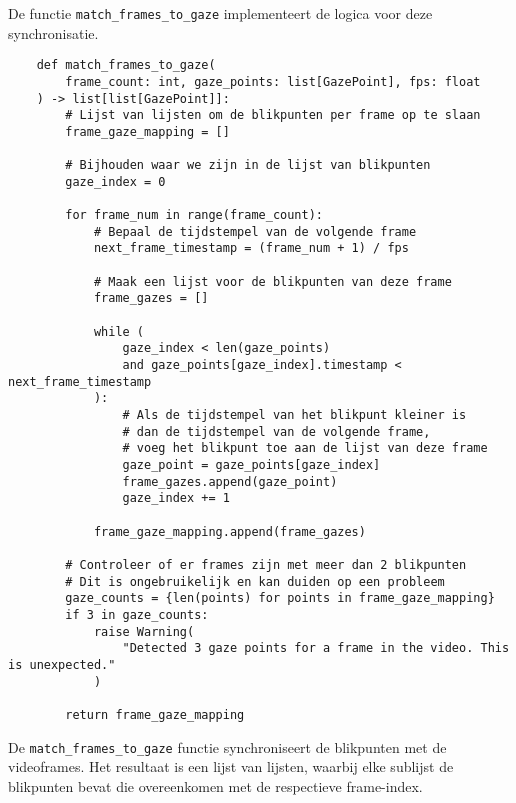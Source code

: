 De functie \texttt{match\_frames\_to\_gaze} implementeert de logica voor deze synchronisatie.
\begin{listing}
  \begin{verbatim}
    def match_frames_to_gaze(
        frame_count: int, gaze_points: list[GazePoint], fps: float
    ) -> list[list[GazePoint]]:
        # Lijst van lijsten om de blikpunten per frame op te slaan
        frame_gaze_mapping = []
        
        # Bijhouden waar we zijn in de lijst van blikpunten
        gaze_index = 0

        for frame_num in range(frame_count):
            # Bepaal de tijdstempel van de volgende frame
            next_frame_timestamp = (frame_num + 1) / fps

            # Maak een lijst voor de blikpunten van deze frame
            frame_gazes = []

            while (
                gaze_index < len(gaze_points)
                and gaze_points[gaze_index].timestamp < next_frame_timestamp
            ):
                # Als de tijdstempel van het blikpunt kleiner is 
                # dan de tijdstempel van de volgende frame,
                # voeg het blikpunt toe aan de lijst van deze frame
                gaze_point = gaze_points[gaze_index]
                frame_gazes.append(gaze_point)
                gaze_index += 1

            frame_gaze_mapping.append(frame_gazes)

        # Controleer of er frames zijn met meer dan 2 blikpunten
        # Dit is ongebruikelijk en kan duiden op een probleem
        gaze_counts = {len(points) for points in frame_gaze_mapping}
        if 3 in gaze_counts:
            raise Warning(
                "Detected 3 gaze points for a frame in the video. This is unexpected."
            )

        return frame_gaze_mapping
  \end{verbatim}
  \caption[\texttt{match\_frames\_to\_gaze} functie]{
    De \texttt{match\_frames\_to\_gaze} functie synchroniseert de blikpunten met de videoframes.
    Het resultaat is een lijst van lijsten, waarbij elke sublijst de blikpunten bevat die overeenkomen met de respectieve frame-index.
  }
\end{listing}

